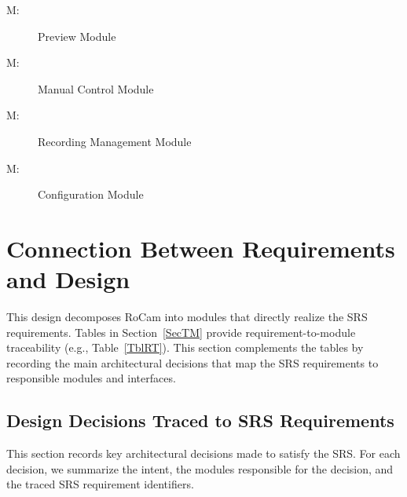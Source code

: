 \documentclass[12pt, titlepage]{article}
\newcounter{mnum}
\newcommand{\mthemnum}{M\themnum}
\begin{document}
\begin{description}
        \begin{description}
          \item [ \mthemnum \label{mPreview}:] Preview Module
          \item [ \mthemnum \label{mManual}:] Manual Control Module
          \item [ \mthemnum \label{mRecordMng}:] Recording Management Module
          \item [ \mthemnum \label{mConfig}:] Configuration Module
        \end{description}
\end{description}

\section{Connection Between Requirements and Design} \label{SecConnection}

This design decomposes RoCam into modules that directly realize the SRS
requirements. Tables in Section~\ref{SecTM} provide requirement-to-module
traceability (e.g., Table~\ref{TblRT}). This section complements the tables by
recording the main architectural decisions that map the SRS requirements to
responsible modules and interfaces.

\subsection{Design Decisions Traced to SRS Requirements}

This section records key architectural decisions made to satisfy the SRS. For
each decision, we summarize the intent, the modules responsible for the
decision, and the traced SRS requirement identifiers.
\end{document}
